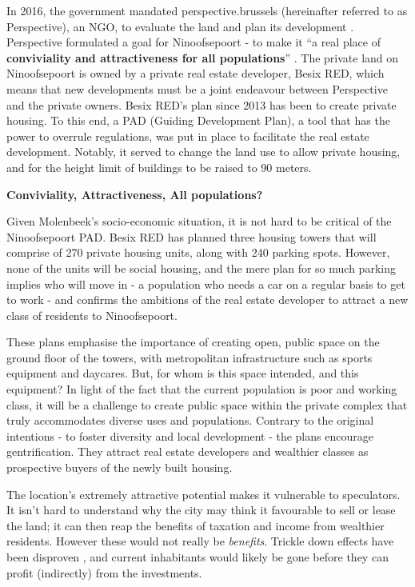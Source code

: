 \documentclass{article}[11pt]
\begin{document}
In 2016, the government mandated perspective.brussels (hereinafter referred to as Perspective), an NGO, to evaluate the land and plan its development \parencite{diagnosticNinove}. Perspective formulated a goal for Ninoofsepoort - to make it ``a real place of \textbf{conviviality and attractiveness for all populations}'' \parencite{perspectiveNinove}. 
The private land on Ninoofsepoort is owned by a private real estate developer, Besix RED, which means that new developments must be a joint endeavour between Perspective and the private owners. Besix RED's plan since 2013 has been to create private housing. 
To this end, a PAD (Guiding Development Plan), a tool that has the power to overrule regulations, was put in place to facilitate the real estate development. Notably, it served to change the land use to allow private housing, and for the height limit of buildings to be raised to 90 meters. 

\textbf{Conviviality, Attractiveness, All populations?}

Given Molenbeek's socio-economic situation, it is not hard to be critical of the Ninoofsepoort PAD. Besix RED has planned three housing towers that will comprise of 270 private housing units, along with 240 parking spots. However, none of the units will be social housing, and the mere plan for so much parking implies who will move in - a population who needs a car on a regular basis to get to work - and confirms the ambitions of the real estate developer to attract a new class of residents to Ninoofsepoort.

These plans emphasise the importance of creating open, public space on the ground floor of the towers, with metropolitan infrastructure such as sports equipment and daycares. But, for whom is this space intended, and this equipment? In light of the fact that the current population is poor and working class, it will be a challenge to create public space within the private complex that truly accommodates diverse uses and populations. 
Contrary to the original intentions - to foster diversity and local development - the plans encourage gentrification. They attract real estate developers and wealthier classes as prospective buyers of the newly built housing.

The location's extremely attractive potential makes it vulnerable to speculators. It isn't hard to understand why the city may think it favourable to sell or lease the land; it can then reap the benefits of taxation and income from wealthier residents. 
However these would not really be \textit{benefits}. Trickle down effects have been disproven \parencite{stiglitz2016inequality}, and current inhabitants would likely be gone before they can profit (indirectly) from the investments.
\end{document}
